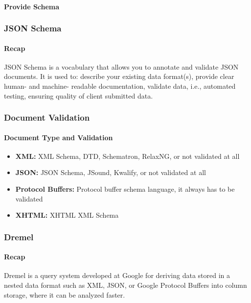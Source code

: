 \paragraph{Provide Schema}




\subsubsection{JSON Schema}

\paragraph{Recap}
JSON Schema is a vocabulary that allows you to annotate and validate JSON documents. It is used to: describe your existing data format(s), provide clear human- and machine- readable documentation, validate data, i.e., automated testing, ensuring quality of client submitted data.




\subsubsection{Document Validation}

\paragraph{Document Type and Validation}
\begin{itemize}
    \item \textbf{XML:} XML Schema, DTD, Schematron, RelaxNG, or not validated at all
    \item \textbf{JSON:} JSON Schema, JSound, Kwalify, or not validated at all
    \item \textbf{Protocol Buffers:} Protocol buffer schema language, it always has to be validated
    \item \textbf{XHTML:} XHTML XML Schema
\end{itemize}



\subsubsection{Dremel}

\paragraph{Recap}
Dremel is a query system developed at Google for deriving data stored in a nested data format such as XML, JSON, or Google Protocol Buffers into column storage, where it can be analyzed faster.

